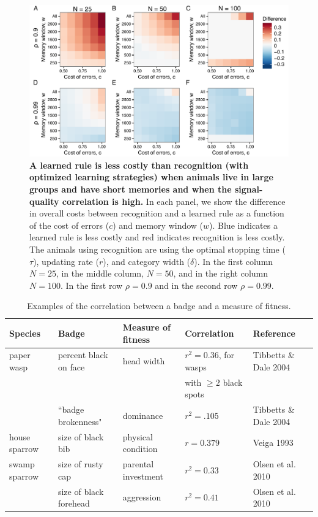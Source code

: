 \begin{figure}
\includegraphics[width=6.85in]{figures/recog_vs_learned_rule.pdf}
\caption{\sffamily\small\textbf{A learned rule is less costly than recognition (with optimized learning strategies) when animals live in large groups and have short memories and when the signal-quality correlation is high.} In each panel, we show the difference in overall costs between recognition and a learned rule as a function of the cost of errors ($c$) and memory window ($w$). Blue indicates a learned rule is less costly and red indicates recognition is less costly. The animals using recognition are using the optimal stopping time ($\tau$), updating rate ($r$), and category width ($\delta$). In the first column $N=25$, in the middle column, $N=50$, and in the right column $N=100$. In the first row $\rho=0.9$ and in the second row $\rho=0.99$.}
\label{comparison}
\end{figure}

\begin{table}
\caption{\label{corr_examples} Examples of the correlation between a badge and a measure of fitness.}
\begin{tabular}{lllll}
Species & Badge & Measure of fitness & Correlation & Reference
\\\hline paper wasp & percent black on face & head width & $r^2=0.36$, for wasps  & Tibbetts \& Dale 2004
\\ & & & with $\geq 2$ black spots
\\ & ``badge brokenness" & dominance & $r^2=.105$ & Tibbetts \& Dale 2004
\\ \hline house sparrow & size of black bib & physical condition & $r=0.379$ & Veiga 1993
\\ \hline swamp sparrow & size of rusty cap & parental investment & $r^2=0.33$ & Olsen et al. 2010
\\ & size of black forehead & aggression & $r^2=0.41$ & Olsen et al. 2010
\end{tabular}
\end{table}


